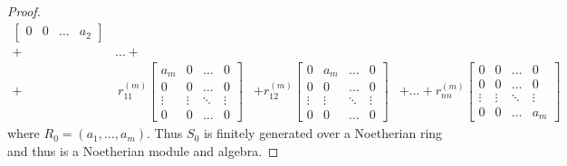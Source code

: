 \documentclass{article}
\newenvironment{problem}[2][Problem]{\begin{trivlist}
\item[\hskip \labelsep {\bfseries #1}\hskip \labelsep {\bfseries #2.}]}{\end{trivlist}}
\begin{document}
\begin{proof}
\begin{align*}
\begin{bmatrix}
      0 & 0 & \hdots & a_2
    \end{bmatrix} \\
    + &\hdots + \\
    + &\ r_{11}^{(m)} \begin{bmatrix}
      a_m & 0 & \hdots & 0 \\
      0 & 0 & \hdots & 0 \\
      \vdots & \vdots & \ddots & \vdots \\
      0 & 0 & \hdots & 0
    \end{bmatrix}
    & + r_{12}^{(m)} \begin{bmatrix}
      0 & a_m & \hdots & 0 \\
      0 & 0 & \hdots & 0 \\
      \vdots & \vdots & \ddots & \vdots \\
      0 & 0 & \hdots & 0
    \end{bmatrix}
    & + \hdots + r_{nn}^{(m)} \begin{bmatrix}
      0 & 0 & \hdots & 0 \\
      0 & 0 & \hdots & 0 \\
      \vdots & \vdots & \ddots & \vdots \\
      0 & 0 & \hdots & a_m
    \end{bmatrix}
  \end{align*}
  where $R_0 = (a_1, \hdots, a_m)$. Thus $S_0$ is finitely generated over a
  Noetherian ring and thus is a Noetherian module and algebra.
\end{proof}
\pagebreak
\begin{problem}{4}
\end{problem}
\end{document}
